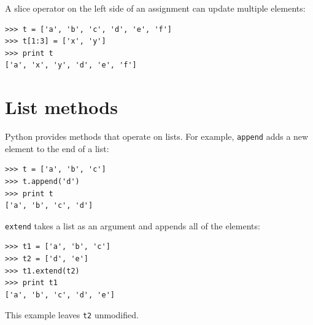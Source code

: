 \documentclass[10pt]{book}
\begin{document}

A slice operator on the left side of an assignment
can update multiple elements:


\beforeverb
\begin{verbatim}
>>> t = ['a', 'b', 'c', 'd', 'e', 'f']
>>> t[1:3] = ['x', 'y']
>>> print t
['a', 'x', 'y', 'd', 'e', 'f']
\end{verbatim}
\afterverb
%


%

%


\section{List methods}


Python provides methods that operate on lists.  For example,
{\tt append} adds a new element to the end of a list:


\beforeverb
\begin{verbatim}
>>> t = ['a', 'b', 'c']
>>> t.append('d')
>>> print t
['a', 'b', 'c', 'd']
\end{verbatim}
\afterverb
%
{\tt extend} takes a list as an argument and appends all of
the elements:


\beforeverb
\begin{verbatim}
>>> t1 = ['a', 'b', 'c']
>>> t2 = ['d', 'e']
>>> t1.extend(t2)
>>> print t1
['a', 'b', 'c', 'd', 'e']
\end{verbatim}
\afterverb
%
This example leaves {\tt t2} unmodified.
\end{document}
